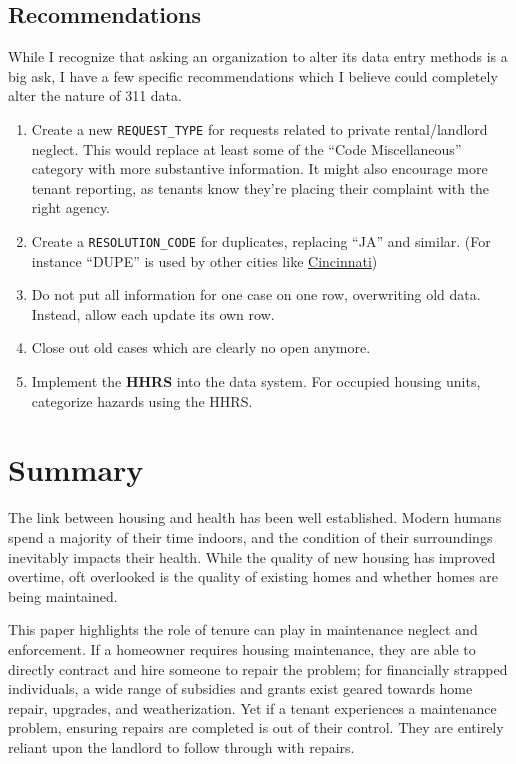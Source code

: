 \documentclass[
  openany]{book}
\providecommand{\tightlist}{%
  \setlength{\itemsep}{0pt}\setlength{\parskip}{0pt}}
\begin{document}
\hypertarget{recommendations}{%
\section{Recommendations}\label{recommendations}}

While I recognize that asking an organization to alter its data entry methods is a big ask, I have a few specific recommendations which I believe could completely alter the nature of 311 data.

\begin{enumerate}
\def\labelenumi{\arabic{enumi}.}
\tightlist
\item
  Create a new \texttt{REQUEST\_TYPE} for requests related to private rental/landlord neglect. This would replace at least some of the ``Code Miscellaneous'' category with more substantive information. It might also encourage more tenant reporting, as tenants know they're placing their complaint with the right agency.
\item
  Create a \texttt{RESOLUTION\_CODE} for duplicates, replacing ``JA'' and similar. (For instance ``DUPE'' is used by other cities like \href{https://data.cincinnati-oh.gov/Thriving-Neighborhoods/Code-Enforcement/cncm-znd6}{Cincinnati})
\item
  Do not put all information for one case on one row, overwriting old data. Instead, allow each update its own row.
\item
  Close out old cases which are clearly no open anymore.
\item
  Implement the \textbf{HHRS} into the data system. For occupied housing units, categorize hazards using the HHRS.
\end{enumerate}

\hypertarget{summary}{%
\chapter{Summary}\label{summary}}

The link between housing and health has been well established. Modern humans spend a majority of their time indoors, and the condition of their surroundings inevitably impacts their health. While the quality of new housing has improved overtime, oft overlooked is the quality of existing homes and whether homes are being maintained.

This paper highlights the role of tenure can play in maintenance neglect and enforcement. If a homeowner requires housing maintenance, they are able to directly contract and hire someone to repair the problem; for financially strapped individuals, a wide range of subsidies and grants exist geared towards home repair, upgrades, and weatherization. Yet if a tenant experiences a maintenance problem, ensuring repairs are completed is out of their control. They are entirely reliant upon the landlord to follow through with repairs.
\end{document}
